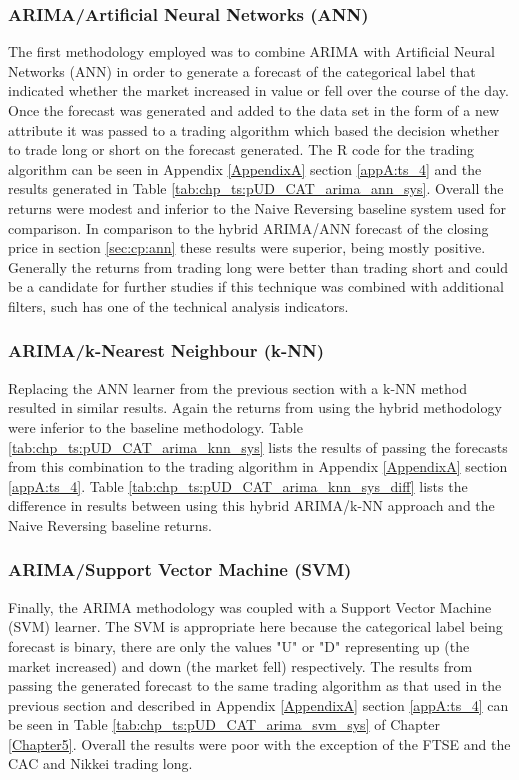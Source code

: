 \subsubsection{ARIMA/Artificial Neural Networks (ANN)}
The first methodology employed was to combine ARIMA with Artificial Neural Networks (ANN) in order to generate a forecast of the categorical label that indicated whether the market increased in value or fell over the course of the day. Once the forecast was generated and added to the data set in the form of a new attribute it was passed to a trading algorithm which based the decision whether to trade long or short on the forecast generated. The R code for the trading algorithm can be seen in Appendix \ref{AppendixA} section \ref{appA:ts_4} and the results generated in Table \ref{tab:chp_ts:pUD_CAT_arima_ann_sys}. Overall the returns were modest and inferior to the Naive Reversing baseline system used for comparison. In comparison to the hybrid ARIMA/ANN forecast of the closing price in section \ref{sec:cp:ann} these results were superior, being mostly positive. Generally the returns from trading long were better than trading short and could be a candidate for further studies if this technique was combined with additional filters, such has one of the technical analysis indicators.

\subsubsection{ARIMA/k-Nearest Neighbour (k-NN)}
Replacing the ANN learner from the previous section with a k-NN method resulted in similar results. Again the returns from using the hybrid methodology were inferior to the baseline methodology. Table \ref{tab:chp_ts:pUD_CAT_arima_knn_sys} lists the results of passing the forecasts from this combination to the trading algorithm in Appendix \ref{AppendixA} section \ref{appA:ts_4}. Table \ref{tab:chp_ts:pUD_CAT_arima_knn_sys_diff} lists the difference in results between using this hybrid ARIMA/k-NN approach and the Naive Reversing baseline returns. 



\subsubsection{ARIMA/Support Vector Machine (SVM)}
Finally, the ARIMA methodology was coupled with a Support Vector Machine (SVM) learner. The SVM is appropriate here because the categorical label being forecast is binary, there are only the values "U" or "D" representing up (the market increased) and down (the market fell) respectively. The results from passing the generated forecast to the same trading algorithm as that used in the previous section and described in Appendix \ref{AppendixA} section \ref{appA:ts_4} can be seen in Table \ref{tab:chp_ts:pUD_CAT_arima_svm_sys} of Chapter \ref{Chapter5}. Overall the results were poor with the exception of the FTSE and the CAC and Nikkei trading long.

